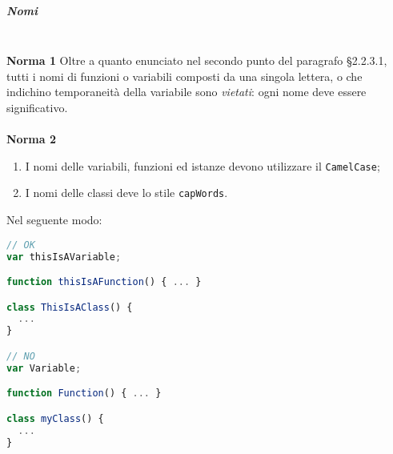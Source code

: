 \subparagraph{Nomi}\-\\
\textbf{Norma 1} Oltre a quanto enunciato nel secondo punto del paragrafo §2.2.3.1, tutti i nomi di funzioni o variabili composti da una singola lettera, o che indichino temporaneità della variabile sono \textit{vietati}: ogni nome deve essere significativo.\\
\-\\
\textbf{Norma 2} 
\begin{enumerate}
	\item I nomi delle variabili, funzioni ed istanze devono utilizzare il \texttt{CamelCase};
	\item I nomi delle classi deve lo stile \texttt{capWords}.
\end{enumerate}
Nel seguente modo:
\begin{lstlisting}[language=JavaScript]
// OK
var thisIsAVariable;

function thisIsAFunction() { ... }

class ThisIsAClass() {
  ...
}

// NO
var Variable;

function Function() { ... }

class myClass() {
  ...
}
\end{lstlisting}

